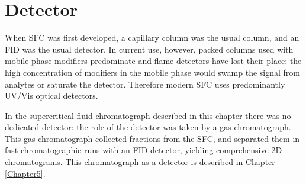 \section{Detector}

When SFC was first developed, a capillary column was the usual column, and an
FID was the usual detector. In current use, however, packed columns used with
mobile phase modifiers predominate and flame detectors have lost their place:
the high concentration of modifiers in the mobile phase would swamp the signal
from analytes or saturate the detector. Therefore modern SFC uses
predominantly UV/Vis optical detectors.

In the supercritical fluid chromatograph described in this chapter there was no
dedicated detector: the role of the detector was taken by a gas chromatograph.
This gas chromatograph collected fractions from the SFC, and separated them in
fast chromatographic runs with an FID detector, yielding comprehensive 2D
chromatograms. This chromatograph-as-a-detector is described in Chapter
\ref{Chapter5}.
